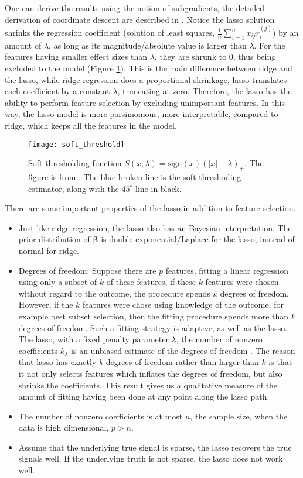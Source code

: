 One can derive the results using the notion of subgradients, the detailed derivation of coordinate descent are described in \cite{friedman2007pathwise}. Notice the lasso solution shrinks the regression coefficient (solution of least squares, $\frac{1}{n}\sum_{i=1}^{n}x_{ij}r_i^{(j)}$) by an amount of $\lambda$, as long as its magnitude/absolute value is larger than $\lambda$. For the features having smaller effect sizes than $\lambda$, they are shrunk to 0, thus being excluded to the model (Figure \ref{fig:soft_threshold}). This is the main difference between ridge and the lasso, while ridge regression does a proportional shrinkage, lasso translates each coefficient by a constant $\lambda$, truncating at zero. Therefore, the lasso has the ability to perform feature selection by excluding unimportant features. In this way, the lasso model is more parsimonious, more interpretable, compared to ridge, which keeps all the features in the model.
\begin{figure}[tbh]
  \centering
  \texttt{[image: soft\_threshold]}
  \caption[Soft thresholding function $S(x, \lambda)=\text{sign}(x)(|x|-\lambda)_+$]{
    Soft thresholding function $S(x, \lambda)=\text{sign}(x)(|x|-\lambda)_+$. The figure is from \cite{hastie2019statistical}. The blue broken line is the soft threshoding estimator, along with the $45^{\circ}$ line in black.
  }
  \label{fig:soft_threshold}
\end{figure}

There are some important properties of the lasso in addition to feature selection.
\begin{itemize}
    \item Just like ridge regression, the lasso also has an Bayesian interpretation. The prior distribution of $\bm{\beta}$ is double exponential/Laplace for the lasso, instead of normal for ridge.
    \item Degrees of freedom: Suppose there are $p$ features, fitting a linear regression using only a subset of $k$ of these features, if these $k$ features were chosen without regard to the outcome, the procedure spends $k$ degrees of freedom. However, if the $k$ features were chose using knowledge of the outcome, for example best subset selection, then the fitting procedure spends more than $k$ degrees of freedom. Such a fitting strategy is adaptive, as well as the lasso. The lasso, with a fixed penalty parameter $\lambda$, the number of nonzero coefficients $k_\lambda$ is an unbiased estimate of the degrees of freedom \citep{zou2007degrees, tibshirani2012degrees}. The reason that lasso has exactly $k$ degrees of freedom rather than larger than $k$ is that it not only selects features which inflates the degrees of freedom, but also shrinks the coefficients. This result gives us a qualitative measure of the amount of fitting having been done at any point along the lasso path.
    \item The number of nonzero coefficients is at most $n$, the sample size, when the data is high dimensional, $p>n$.
    \item Assume that the underlying true signal is sparse, the lasso recovers the true signals well. If the underlying truth is not sparse, the lasso does not work well. 
\end{itemize}

